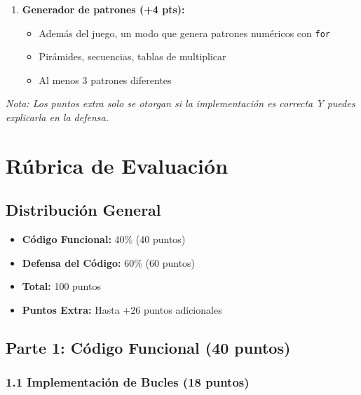 \documentclass[12pt,a4paper]{article}
\begin{document}
\begin{enumerate}[leftmargin=*]
    \item \textbf{Generador de patrones (+4 pts):}
    \begin{itemize}
        \item Además del juego, un modo que genera patrones numéricos con \texttt{for}
        \item Pirámides, secuencias, tablas de multiplicar
        \item Al menos 3 patrones diferentes
    \end{itemize}
\end{enumerate}

\textit{Nota: Los puntos extra solo se otorgan si la implementación es correcta Y puedes explicarla en la defensa.}

\newpage

\section{Rúbrica de Evaluación}

\subsection{Distribución General}

\begin{itemize}
    \item \textbf{Código Funcional:} 40\% (40 puntos)
    \item \textbf{Defensa del Código:} 60\% (60 puntos)
    \item \textbf{Total:} 100 puntos
    \item \textbf{Puntos Extra:} Hasta +26 puntos adicionales
\end{itemize}

\subsection{Parte 1: Código Funcional (40 puntos)}

\subsubsection{1.1 Implementación de Bucles (18 puntos)}
\end{document}
